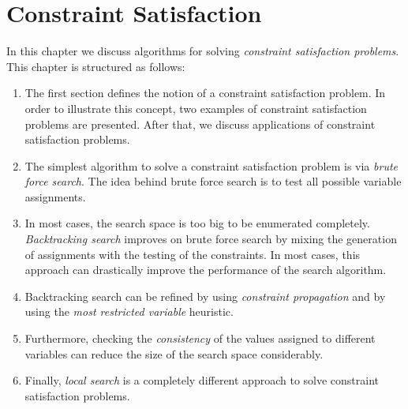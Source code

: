 \chapter{Constraint Satisfaction}
In this chapter we discuss algorithms for solving \emph{\color{blue}constraint satisfaction problems}.
This chapter is structured as follows:
\begin{enumerate}
\item The first section defines the notion of a constraint satisfaction problem.  In order to illustrate this
      concept, two examples of constraint satisfaction problems are presented.  After that, we discuss
      applications of constraint satisfaction problems.
\item The simplest algorithm to solve a constraint satisfaction problem is via \emph{\color{blue}brute force search}.
      The idea behind brute force search is to test all possible variable assignments.
\item In most cases, the search space is too big to be enumerated completely.
      \emph{\color{blue}Backtracking search} improves on brute force search by mixing the generation
      of assignments with the testing of the constraints.  In most cases, this approach can
      drastically improve the performance of the search algorithm.
\item Backtracking search can be refined by using \emph{\color{blue}constraint propagation} and by
      using the \emph{\color{blue}most restricted variable} heuristic.
\item Furthermore, checking the \emph{\color{blue}consistency} of the values assigned to different variables
      can reduce the size of the search space considerably. 
\item Finally, \emph{\color{blue}local search} is a completely different approach to solve
      constraint satisfaction problems.
\end{enumerate}

